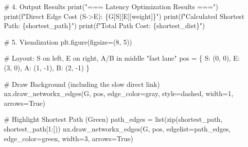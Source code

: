 \documentclass[
  letterpaper,
  DIV=11,
  numbers=noendperiod]{scrreprt}
\newenvironment{Shaded}{\begin{snugshade}}{\end{snugshade}}
\newcommand{\BuiltInTok}[1]{\textcolor[rgb]{0.00,0.23,0.31}{#1}}
\newcommand{\CommentTok}[1]{\textcolor[rgb]{0.37,0.37,0.37}{#1}}
\newcommand{\DecValTok}[1]{\textcolor[rgb]{0.68,0.00,0.00}{#1}}
\newcommand{\NormalTok}[1]{\textcolor[rgb]{0.00,0.23,0.31}{#1}}
\newcommand{\OperatorTok}[1]{\textcolor[rgb]{0.37,0.37,0.37}{#1}}
\newcommand{\SpecialCharTok}[1]{\textcolor[rgb]{0.37,0.37,0.37}{#1}}
\newcommand{\SpecialStringTok}[1]{\textcolor[rgb]{0.13,0.47,0.30}{#1}}
\newcommand{\StringTok}[1]{\textcolor[rgb]{0.13,0.47,0.30}{#1}}
\newcommand{\VariableTok}[1]{\textcolor[rgb]{0.07,0.07,0.07}{#1}}
\begin{document}
\begin{Shaded}
\begin{Highlighting}[]
\CommentTok{\# 4. Output Results}
\BuiltInTok{print}\NormalTok{(}\StringTok{"=== Latency Optimization Results ==="}\NormalTok{)}
\BuiltInTok{print}\NormalTok{(}\SpecialStringTok{f"Direct Edge Cost (S{-}\textgreater{}E): }\SpecialCharTok{\{}\NormalTok{G[}\StringTok{\textquotesingle{}S\textquotesingle{}}\NormalTok{][}\StringTok{\textquotesingle{}E\textquotesingle{}}\NormalTok{][}\StringTok{\textquotesingle{}weight\textquotesingle{}}\NormalTok{]}\SpecialCharTok{\}}\SpecialStringTok{"}\NormalTok{)}
\BuiltInTok{print}\NormalTok{(}\SpecialStringTok{f"Calculated Shortest Path: }\SpecialCharTok{\{}\NormalTok{shortest\_path}\SpecialCharTok{\}}\SpecialStringTok{"}\NormalTok{)}
\BuiltInTok{print}\NormalTok{(}\SpecialStringTok{f"Total Path Cost: }\SpecialCharTok{\{}\NormalTok{shortest\_dist}\SpecialCharTok{\}}\SpecialStringTok{"}\NormalTok{)}

\CommentTok{\# 5. Visualization}
\NormalTok{plt.figure(figsize}\OperatorTok{=}\NormalTok{(}\DecValTok{8}\NormalTok{, }\DecValTok{5}\NormalTok{))}

\CommentTok{\# Layout: S on left, E on right, A/B in middle "fast lane"}
\NormalTok{pos }\OperatorTok{=}\NormalTok{ \{}
    \StringTok{\textquotesingle{}S\textquotesingle{}}\NormalTok{: (}\DecValTok{0}\NormalTok{, }\DecValTok{0}\NormalTok{),}
    \StringTok{\textquotesingle{}E\textquotesingle{}}\NormalTok{: (}\DecValTok{3}\NormalTok{, }\DecValTok{0}\NormalTok{),}
    \StringTok{\textquotesingle{}A\textquotesingle{}}\NormalTok{: (}\DecValTok{1}\NormalTok{, }\OperatorTok{{-}}\DecValTok{1}\NormalTok{),}
    \StringTok{\textquotesingle{}B\textquotesingle{}}\NormalTok{: (}\DecValTok{2}\NormalTok{, }\OperatorTok{{-}}\DecValTok{1}\NormalTok{)}
\NormalTok{\}}

\CommentTok{\# Draw Background (including the slow direct link)}
\NormalTok{nx.draw\_networkx\_edges(G, pos, edge\_color}\OperatorTok{=}\StringTok{\textquotesingle{}gray\textquotesingle{}}\NormalTok{, style}\OperatorTok{=}\StringTok{\textquotesingle{}dashed\textquotesingle{}}\NormalTok{, width}\OperatorTok{=}\DecValTok{1}\NormalTok{, arrows}\OperatorTok{=}\VariableTok{True}\NormalTok{)}

\CommentTok{\# Highlight Shortest Path (Green)}
\NormalTok{path\_edges }\OperatorTok{=} \BuiltInTok{list}\NormalTok{(}\BuiltInTok{zip}\NormalTok{(shortest\_path, shortest\_path[}\DecValTok{1}\NormalTok{:]))}
\NormalTok{nx.draw\_networkx\_edges(G, pos, edgelist}\OperatorTok{=}\NormalTok{path\_edges, edge\_color}\OperatorTok{=}\StringTok{\textquotesingle{}green\textquotesingle{}}\NormalTok{, width}\OperatorTok{=}\DecValTok{3}\NormalTok{, arrows}\OperatorTok{=}\VariableTok{True}\NormalTok{)}


\end{Highlighting}
\end{Shaded}
\end{document}
